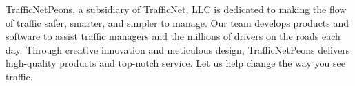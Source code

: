 TrafficNetPeons, a subsidiary of TrafficNet, LLC is dedicated to making the flow of traffic safer, smarter, and simpler to manage. Our team develops products and software to assist traffic managers and the millions of drivers on the roads each day. Through creative innovation and meticulous design, TrafficNetPeons delivers high-quality products and top-notch service. Let us help change the way you see traffic.
